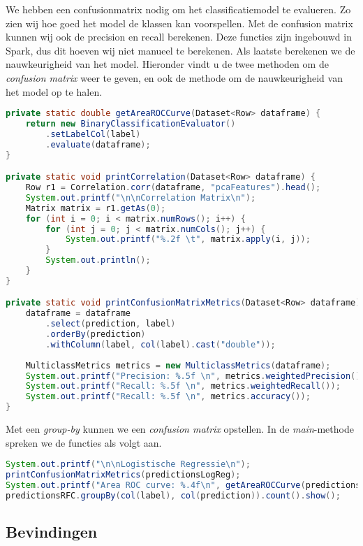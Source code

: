 \documentclass[a4paper,10pt,twoside]{report}
\begin{document}
We hebben een confusionmatrix nodig om het classificatiemodel te evalueren. Zo zien wij hoe goed het model de klassen kan voorspellen. Met de confusion matrix kunnen wij ook de precision en recall berekenen. Deze functies zijn ingebouwd in Spark, dus dit hoeven wij niet manueel te berekenen. Als laatste berekenen we de nauwkeurigheid van het model. Hieronder vindt u de twee methoden om de \textit{confusion matrix} weer te geven, en ook de methode om de nauwkeurigheid van het model op te halen.

\begin{lstlisting}[language=Java]
	private static double getAreaROCCurve(Dataset<Row> dataframe) {
	return new BinaryClassificationEvaluator()
		.setLabelCol(label)
		.evaluate(dataframe);
}

private static void printCorrelation(Dataset<Row> dataframe) {
	Row r1 = Correlation.corr(dataframe, "pcaFeatures").head();
	System.out.printf("\n\nCorrelation Matrix\n");
	Matrix matrix = r1.getAs(0);
	for (int i = 0; i < matrix.numRows(); i++) {
		for (int j = 0; j < matrix.numCols(); j++) {
			System.out.printf("%.2f \t", matrix.apply(i, j));
		}
		System.out.println();
	}
}

private static void printConfusionMatrixMetrics(Dataset<Row> dataframe) {
	dataframe = dataframe
		.select(prediction, label)
		.orderBy(prediction)
		.withColumn(label, col(label).cast("double"));
	
	MulticlassMetrics metrics = new MulticlassMetrics(dataframe);
	System.out.printf("Precision: %.5f \n", metrics.weightedPrecision());
	System.out.printf("Recall: %.5f \n", metrics.weightedRecall());
	System.out.printf("Recall: %.5f \n", metrics.accuracy());
}
\end{lstlisting}

Met een \textit{group-by} kunnen we een \textit{confusion matrix} opstellen. In de \textit{main}-methode spreken we de functies als volgt aan.

\begin{lstlisting}[language=Java]
System.out.printf("\n\nLogistische Regressie\n");
printConfusionMatrixMetrics(predictionsLogReg);
System.out.printf("Area ROC curve: %.4f\n", getAreaROCCurve(predictionsLogReg));
predictionsRFC.groupBy(col(label), col(prediction)).count().show(); 
\end{lstlisting}

\subsection*{Bevindingen}
\end{document}
